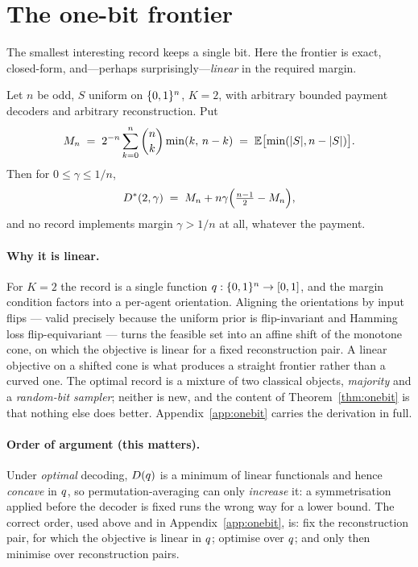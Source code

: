 \section{The one-bit frontier}
\label{sec:onebit}

The smallest interesting record keeps a single bit. Here the frontier is exact,
closed-form, and---perhaps surprisingly---\emph{linear} in the required margin.

\begin{theorem}
\label{thm:onebit}
Let $n$ be odd, $S$ uniform on $\{0,1\}^n$, $K = 2$, with arbitrary bounded payment
decoders and arbitrary reconstruction. Put
\[
  M_n \;=\; 2^{-n}\sum_{k=0}^{n}\binom{n}{k}\min(k,\,n-k)
       \;=\; \mathbb{E}\bigl[\min(|S|, n-|S|)\bigr].
\]
Then for $0 \le \gamma \le 1/n$,
\[
  D^\ast(2,\gamma) \;=\; M_n + n\gamma\Bigl(\tfrac{n-1}{2} - M_n\Bigr),
\]
and no record implements margin $\gamma > 1/n$ at all, whatever the payment.
\end{theorem}

\paragraph{Why it is linear.}
For $K = 2$ the record is a single function $q : \{0,1\}^n \to [0,1]$, and the
margin condition factors into a per-agent orientation. Aligning the orientations
by input flips --- valid precisely because the uniform prior is flip-invariant
and Hamming loss flip-equivariant --- turns the feasible set into an affine shift
of the monotone cone, on which the objective is linear for a fixed reconstruction
pair. A linear objective on a shifted cone is what produces a straight frontier
rather than a curved one. The optimal record is a mixture of two classical
objects, \emph{majority} and a \emph{random-bit sampler}; neither is new, and the
content of Theorem~\ref{thm:onebit} is that nothing else does better.
Appendix~\ref{app:onebit} carries the derivation in full.

\paragraph{Order of argument (this matters).}
Under \emph{optimal} decoding, $D(q)$ is a minimum of linear functionals and
hence \emph{concave} in $q$, so permutation-averaging can only
\emph{increase} it: a symmetrisation applied before the decoder is fixed runs
the wrong way for a lower bound. The correct order, used above and in
Appendix~\ref{app:onebit}, is: fix the reconstruction pair, for which the
objective is linear in $q$; optimise over $q$; and only then minimise over
reconstruction pairs.


